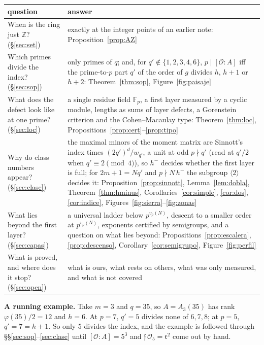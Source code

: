 \documentclass[11pt,a4paper]{article}
\theoremstyle{definition}
\newcommand{\ZZ}{\mathbb{Z}}
\newcommand{\FF}{\mathbb{F}}
\newcommand{\cO}{\mathcal{O}}
\newcommand{\cf}{\mathfrak{f}}
\newcommand{\rad}{\mathfrak{r}}
\begin{document}
\medskip
\begin{center}\small
{}
\begin{tabular}{p{}p{}}
\toprule
question & answer \\
\midrule
When is the ring just $\ZZ$? (\S\ref{sec:set}) & exactly at the integer points of an earlier note: Proposition~\ref{prop:AZ} \\
Which primes divide the index? (\S\ref{sec:sop}) & only primes of $q$; and, for $q'\notin\{1,2,3,4,6\}$, $p\mid[\cO:A]$ iff the prime-to-$p$ part $q'$ of the order of $g$ divides $h$, $h+1$ or $h+2$: Theorem~\ref{thm:sop}, Figure~\ref{fig:paisaje} \\
What does the defect look like at one prime? (\S\ref{sec:loc}) & a single residue field $\FF_p$, a first layer measured by a cyclic module, lengths as sums of layer defects, a Gorenstein criterion and the Cohen--Macaulay type: Theorem~\ref{thm:loc}, Propositions~\ref{prop:cert}--\ref{prop:tipo} \\
Why do class numbers appear? (\S\ref{sec:clase}) & the maximal minors of the moment matrix are Sinnott's index times $(2q')^d/w_{q'}$, a unit at odd $p\nmid q'$ (read at $q'/2$ when $q'\equiv2\pmod4$), so $h^-$ decides whether the first layer is full; for $2m+1=Nq'$ and $p\nmid N\,h^-$ the subgroup $\langle2\rangle$ decides it: Proposition~\ref{prop:sinnott}, Lemma~\ref{lem:dobla}, Theorem~\ref{thm:hminus}, Corollaries~\ref{cor:simple}, \ref{cor:dos}, \ref{cor:indice}, Figures~\ref{fig:sierra}--\ref{fig:zonas} \\
What lies beyond the first layer? (\S\ref{sec:capas}) & a universal ladder below $p^{v_p(N)}$, descent to a smaller order at $p^{v_p(N)}$, exponents certified by semigroups, and a question on what lies beyond: Propositions~\ref{prop:escalera}, \ref{prop:descenso}, Corollary~\ref{cor:semigrupo}, Figure~\ref{fig:perfil} \\
What is proved, and where does it stop? (\S\ref{sec:open}) & what is ours, what rests on others, what was only measured, and what is not covered \\
\bottomrule
\end{tabular}
\end{center}


\noindent\textbf{A running example.} Take $m=3$ and $q=35$, so $A=A_3(35)$ has rank $\varphi(35)/2=12$ and $h=6$. At
$p=7$, $q'=5$ divides none of $6,7,8$; at $p=5$, $q'=7=h+1$. So only $5$ divides the index, and the example is
followed through \S\S\ref{sec:sop}--\ref{sec:clase} until $[\cO:A]=5^3$ and $\cf\,\cO_5=\rad^2$ come out by hand.
\end{document}
